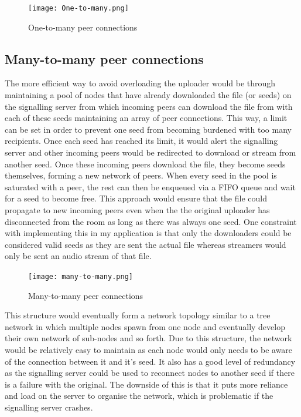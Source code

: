 \documentclass[]{report}
\begin{document}
			\begin{figure}[H]
				\caption{One-to-many peer connections}
				\centering
				\texttt{[image: One-to-many.png]}
			\end{figure}	
						
			\subsection{Many-to-many peer connections}
			The more efficient way to avoid overloading the uploader would be through maintaining a pool of nodes that have already downloaded the file (or seeds) on the signalling server from which incoming peers can download the file from with each of these seeds maintaining an array of peer connections. This way, a limit can be set in order to prevent one seed from becoming burdened with too many recipients. Once each seed has reached its limit, it would alert the signalling server and other incoming peers would be redirected to download or stream from another seed. Once these incoming peers download the file,  they become seeds themselves, forming a new network of peers. When every seed in the pool is saturated with a peer, the rest can then be enqueued via a FIFO queue and wait for a seed to become free. This approach would ensure that the file could propagate to new incoming peers even when the the original uploader has disconnected from the room as long as there was always one seed. One constraint with implementing this in my application is that only the downloaders could be considered valid seeds as they are sent the actual file whereas streamers would only be sent an audio stream of that file.

			\begin{figure}[H]
				\caption{Many-to-many peer connections}
				\centering
				\texttt{[image: many-to-many.png]}
			\end{figure}	
			
			This structure would eventually form a network topology similar to a tree network in which multiple nodes spawn from one node and eventually develop their own network of sub-nodes and so forth. Due to this structure, the network would be relatively easy to maintain as each node would only needs to be aware of the connection between it and it's seed. It also has a good level of redundancy as the signalling server could be used to reconnect nodes to another seed if there is a failure with the original. The downside of this is that it puts more reliance and load on the server to organise the network, which is problematic if the signalling server crashes.
			
\end{document}
